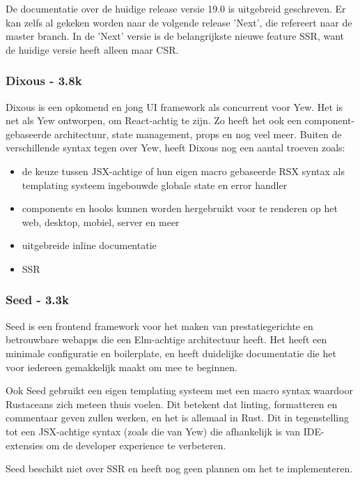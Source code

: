 De documentatie over de huidige release versie 19.0 is uitgebreid geschreven.  Er kan zelfs al
gekeken worden naar de volgende release 'Next', die refereert naar de master branch. In de 'Next'
versie is de belangrijkste nieuwe feature SSR, want de huidige versie heeft alleen maar CSR.

\subsubsection{Dixous - 3.8k}

Dixous is een opkomend en jong UI framework als concurrent voor Yew. Het is net als Yew ontworpen,
om React-achtig te zijn. Zo heeft het ook een component-gebaseerde architectuur, state management,
props en nog veel meer. Buiten de verschillende syntax tegen over Yew, heeft Dixous nog een aantal
troeven zoals:  
\begin{itemize}
  \item de keuze tussen JSX-achtige of hun eigen macro gebaseerde RSX syntax als templating systeem
    ingebouwde globale state en error handler 

  \item components en hooks kunnen worden hergebruikt voor te renderen op het web, desktop, mobiel,
    server en meer 

  \item uitgebreide inline documentatie 

  \item SSR 
\end{itemize}

\subsubsection{Seed - 3.3k}

Seed is een frontend framework voor het maken van prestatiegerichte en betrouwbare webapps die een
Elm-achtige architectuur heeft. Het heeft een minimale configuratie en boilerplate, en heeft
duidelijke documentatie die het voor iedereen gemakkelijk maakt om mee te beginnen.  

Ook Seed gebruikt een eigen templating systeem met een macro syntax waardoor Rustaceans zich meteen
thuis voelen. Dit betekent dat linting, formatteren en commentaar geven zullen werken, en het is
allemaal in Rust. Dit in tegenstelling tot een JSX-achtige syntax (zoals die van Yew) die
afhankelijk is van IDE-extensies om de developer experience te verbeteren. 

Seed beschikt niet over SSR en heeft nog geen plannen om het te implementeren. 

